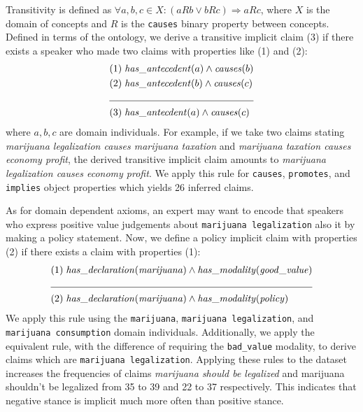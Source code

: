 Transitivity is defined as $\forall a, b, c \in X : (a R b \vee b R c)
\Rightarrow a R c$, where $X$ is the domain of concepts and $R$ is the
\texttt{causes} binary property between concepts. Defined in terms of the ontology, 
we derive a transitive implicit claim (3) if 
there exists a speaker who made two claims with properties like (1) and (2):
\begin{align*}
	(1) & \hspace{0.1cm} \mathit{has\_antecedent} (a)  \wedge  \mathit{causes} (b) \\
	(2) & \hspace{0.1cm} \mathit{has\_antecedent} (b) \wedge \mathit{causes} (c) \\
	\cline{1-3}
	(3) & \hspace{0.1cm} \mathit{has\_antecdent} (a) \wedge \mathit{causes} (c)
\end{align*}
where $a, b, c$ are domain individuals. For example, if we take two claims
stating
\emph{marijuana legalization causes marijuana taxation} and 
\emph{marijuana taxation causes economy profit}, the derived transitive
implicit claim amounts to \emph{marijuana legalization causes economy profit}.
We apply this rule for \texttt{causes}, \texttt{promotes}, and \texttt{implies}
object properties which yields 26 inferred claims. 

As for domain dependent axioms, an expert may want to encode that 
speakers who express positive value judgements about 
\texttt{marijuana legalization} also  it by making 
a policy statement. 
Now, we define a policy implicit claim with properties (2)  if there
exists a claim with properties (1):
\begin{align*}
	(1) & \hspace{0.1cm} \mathit{has\_declaration} (\mathit{marijuana}) 
	\wedge \mathit{has\_modality} (\mathit{good\_value})\\
	\cline{1-3}
	(2) & \hspace{0.1cm} \mathit{has\_declaration} (\mathit{marijuana}) 
	 \wedge \mathit{has\_modality} (\mathit{policy})
\end{align*}
We apply this rule using the \texttt{marijuana}, \texttt{marijuana
legalization}, and \texttt{marijuana consumption} domain individuals.
Additionally, we apply the equivalent rule, with the difference of requiring
the \texttt{bad\_value} modality, to derive claims which are 
\texttt{marijuana legalization}. Applying these rules to the dataset increases
the frequencies of claims \emph{marijuana should be legalized} and {marijuana
shouldn't be legalized} from 35 to 39 and 22 to 37 respectively.  This
indicates that negative stance is implicit much more often than positive
stance. 

